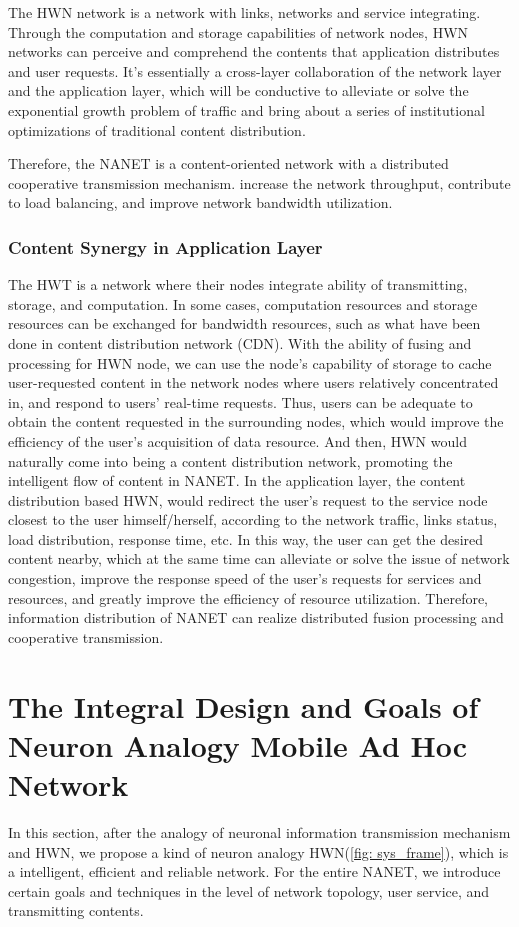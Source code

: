 \documentclass[journal,comsoc]{IEEEtran}
\begin{document}
				The HWN network is a network with links, networks and service integrating.
				Through the computation and storage capabilities of network nodes, HWN networks can perceive and comprehend the contents that application distributes and user requests.
				It's essentially a cross-layer collaboration of the network layer and the application layer, 
				which will be conductive to alleviate or solve the exponential growth problem of traffic and bring about a series of  institutional optimizations of traditional content distribution.
				
				Therefore, the NANET is a content-oriented network with a distributed cooperative transmission mechanism. increase the network throughput, 
				contribute to load balancing, and improve network bandwidth utilization.
			
			\subsubsection{Content Synergy in Application Layer}
				The HWT is a network where their nodes integrate ability of transmitting, storage, and computation.
				In some cases, computation resources and storage resources can be exchanged for bandwidth resources, such as what have been done in content distribution network (CDN). 
				With the ability of fusing and processing for HWN node, we can use the node's capability of storage to cache user-requested content in the network nodes where users relatively concentrated in, and respond to users' real-time requests. Thus, users can be adequate to obtain the content requested in the surrounding nodes, which would improve the efficiency of the user's acquisition of data resource.
				And then, HWN would naturally come into being a content distribution network, promoting the intelligent flow of content in NANET.
				In the application layer, the content distribution based HWN, would redirect the user's request to the service node closest to the user himself/herself, according to the network traffic, links status, load distribution, response time, etc.
				In this way, the user can get the desired content nearby, which at the same time can alleviate or solve the issue of network congestion, improve the response speed of the user's requests for services and resources, and greatly improve the efficiency of resource utilization.
				Therefore, information distribution of NANET can realize distributed fusion processing and cooperative transmission.
		
	
	\section{The Integral Design and Goals of Neuron Analogy Mobile Ad Hoc Network}
	\label{section: general_design}
		In this section, after the analogy of neuronal information transmission mechanism and HWN, 
		we propose a kind of neuron analogy HWN(\ref{fig: sys_frame}), which is a intelligent, efficient and reliable network.
		For the entire NANET, we introduce certain goals and techniques in the level of network topology, user service, and transmitting contents.
		
\end{document}
